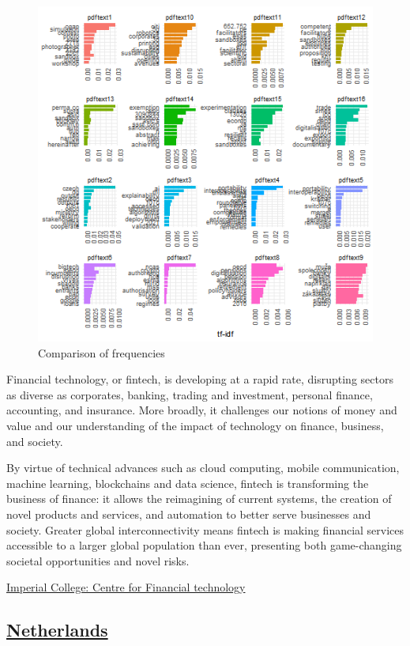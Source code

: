 \documentclass[
]{book}
\begin{document}
\begin{figure}

{\centering \includegraphics[width=0.8\linewidth]{img/tf_idf} 

}

\caption{Comparison of frequencies}\label{fig:nice-figN3}
\end{figure}

Financial technology, or fintech, is developing at a rapid rate, disrupting sectors as diverse as corporates, banking, trading and investment, personal finance, accounting, and insurance. More broadly, it challenges our notions of money and value and our understanding of the impact of technology on finance, business, and society.

By virtue of technical advances such as cloud computing, mobile communication, machine learning, blockchains and data science, fintech is transforming the business of finance: it allows the reimagining of current systems, the creation of novel products and services, and automation to better serve businesses and society. Greater global interconnectivity means fintech is making financial services accessible to a larger global population than ever, presenting both game-changing societal opportunities and novel risks.

\href{https://www.imperial.ac.uk/business-school/faculty-research/research-centres/centre-financial-technology/}{Imperial College: Centre for Financial technology}

\hypertarget{netherlands}{%
\subsection{\texorpdfstring{\href{https://www.afm.nl/en/professionals/onderwerpen/innovationhub-maatwerk}{Netherlands}}{Netherlands}}\label{netherlands}}
\end{document}
